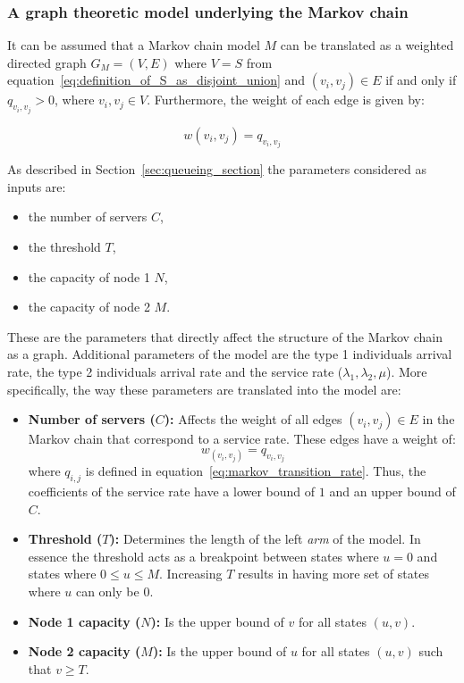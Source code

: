 \subsubsection{A graph theoretic model underlying the Markov chain}
It can be assumed that a Markov chain model \(M\) can be translated as a
weighted directed graph \(G_M = (V, E)\) where \(V=S\) from
equation~\eqref{eq:definition_of_S_as_disjoint_union} and \((v_i, v_j)\in E\) if
and only if \(q_{v_i, v_j}>0\), where \(v_i, v_j \in V\).
Furthermore, the weight of each edge is given by:

\[
    w(v_i, v_j) = q_{v_i, v_j}
\]

As described in Section~\ref{sec:queueing_section} the parameters considered as
inputs are:

\begin{itemize}
    \item the number of servers \(C\),
    \item the threshold \(T\),
    \item the capacity of node 1 \(N\),
    \item the capacity of node 2 \(M\).
\end{itemize}

These are the parameters that directly affect the structure of the Markov chain
as a graph.
Additional parameters of the model are the type 1 individuals arrival rate,
the type 2 individuals arrival rate and the service rate (\(\lambda_1,
\lambda_2, \mu\)).
More specifically, the way these parameters are translated into the model are:

\begin{itemize}
    \item \textbf{Number of servers (\(C\)):} Affects the weight of all edges
    \((v_i, v_j) \in E\) in the Markov chain that correspond to a service rate.
    These edges have a weight of:
    \begin{equation*}
        w_{(v_i, v_j)} = q_{v_i, v_j}
    \end{equation*}
    where \(q_{i,j}\) is defined in equation~\eqref{eq:markov_transition_rate}.
    Thus, the coefficients of the service rate have a lower bound of \(1\) and
    an upper bound of \(C\).
    \item \textbf{Threshold (\(T\)):} Determines the length of the left
    \textit{arm} of the model.
    In essence the threshold acts as a breakpoint between states where \(u=0\)
    and states where \(0 \leq u \leq M\).
    Increasing \(T\) results in having more set of states where \(u\) can only
    be \(0\).
    \item \textbf{Node 1 capacity (\(N\)):} Is the upper bound of \(v\)
    for all  states \((u,v)\).
    \item \textbf{Node 2 capacity (\(M\)):} Is the upper bound of \(u\)
    for all states \((u,v)\) such that \(v \geq T\).
\end{itemize}


